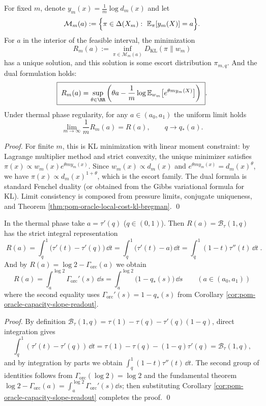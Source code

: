 \begin{theorem}\label{thm:pom-oracle-i-projection-escort}
For fixed \(m\), denote \(y_m(x)=\frac{1}{m}\log d_m(x)\) and let
\[
\mathcal{M}_m(a):=\Bigl\{\pi\in\Delta(X_m):\ \mathbb{E}_{\pi}[y_m(X)]=a\Bigr\}.
\]
For \(a\) in the interior of the feasible interval, the minimization
\[
R_m(a):=\inf_{\pi\in\mathcal{M}_m(a)}D_{\mathrm{KL}}(\pi\|w_m)
\]
has a unique solution, and this solution is some escort distribution \(\pi_{m,q}\).
And the dual formulation holds:
\[
\boxed{\;
R_m(a)=\sup_{\theta\in\RR}\left(\theta a-\frac{1}{m}\log \mathbb{E}_{w_m}\bigl[e^{\theta m y_m(X)}\bigr]\right)\; }.
\]
Under thermal phase regularity, for any \(a\in(a_0,a_1)\) the uniform limit holds
\[
\lim_{m\to\infty}\frac{1}{m}R_m(a)=R(a),
\qquad
q\to q_*(a).
\]
\end{theorem}
\begin{proof}
For finite \(m\), this is KL minimization with linear moment constraint: by Lagrange multiplier method and strict convexity, the unique minimizer satisfies
\(
\pi(x)\propto w_m(x)e^{\theta m y_m(x)}
\).
Since \(w_m(x)\propto d_m(x)\) and \(e^{\theta m y_m(x)}=d_m(x)^{\theta}\), we have \(\pi(x)\propto d_m(x)^{1+\theta}\), which is the escort family.
The dual formula is standard Fenchel duality (or obtained from the Gibbs variational formula for KL).
Limit consistency is composed from pressure limits, conjugate uniqueness, and Theorem \ref{thm:pom-oracle-local-cost-kl-bregman}. \qed
\end{proof}
\begin{theorem}\label{thm:pom-oracle-local-cost-area-representation}
In the thermal phase take \(a=\tau'(q)\) (\(q\in(0,1)\)).
Then \(R(a)=\mathcal{B}_{\tau}(1,q)\) has the strict integral representation
\[
\boxed{\;
R(a)=\int_{q}^{1}\bigl(\tau'(t)-\tau'(q)\bigr)\,\dd t
=\int_{q}^{1}\bigl(\tau'(t)-a\bigr)\,\dd t
=\int_{q}^{1}(1-t)\tau''(t)\,\dd t\; }.
\]
And by \(R(a)=\log 2-\Gamma_{\mathrm{orc}}(a)\) we obtain
\[
\boxed{\;
R(a)=\int_{a}^{\log 2}\Gamma_{\mathrm{orc}}'(s)\,\dd s
=\int_{a}^{\log 2}\bigl(1-q_*(s)\bigr)\,\dd s\qquad (a\in(a_0,a_1))\;}
\]
where the second equality uses \(\Gamma_{\mathrm{orc}}'(s)=1-q_*(s)\) from Corollary \ref{cor:pom-oracle-capacity-slope-readout}.
\end{theorem}
\begin{proof}
By definition \(\mathcal{B}_{\tau}(1,q)=\tau(1)-\tau(q)-\tau'(q)(1-q)\), direct integration gives
\[
\int_q^1(\tau'(t)-\tau'(q))\,\dd t=\tau(1)-\tau(q)-(1-q)\tau'(q)=\mathcal{B}_{\tau}(1,q),
\]
and by integration by parts we obtain \(\int_q^1(1-t)\tau''(t)\,\dd t\).
The second group of identities follows from \(\Gamma_{\mathrm{orc}}(\log 2)=\log 2\) and the fundamental theorem
\(
\log 2-\Gamma_{\mathrm{orc}}(a)=\int_a^{\log 2}\Gamma_{\mathrm{orc}}'(s)\dd s
\);
then substituting Corollary \ref{cor:pom-oracle-capacity-slope-readout} completes the proof. \qed
\end{proof}
\endinput





